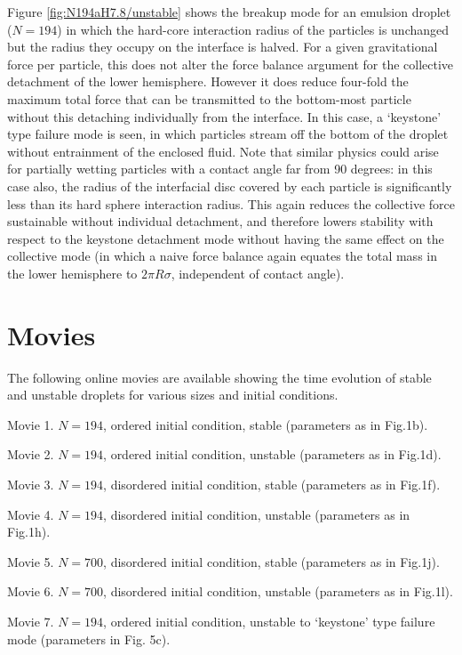 \documentclass[aps,prl,superscriptaddress,twocolumn,showpacs,floatfix]{revtex4-1}
\begin{document}
Figure \ref{fig:N194aH7.8/unstable} shows the breakup mode for an emulsion droplet ($N=194$) in which the hard-core interaction radius of the particles is unchanged but the radius they occupy on the interface is halved. For a given gravitational force per particle, this does not alter the force balance argument for the collective detachment of the lower hemisphere. However it does reduce four-fold the maximum total force that can be transmitted to the bottom-most particle without this detaching individually from the interface. In this case, a `keystone' type failure mode is seen, in which particles stream off the bottom of the droplet without entrainment of the enclosed fluid. Note that similar physics could arise for partially wetting particles with a contact angle far from 90 degrees: in this case also, the radius of the interfacial disc covered by each particle is significantly less than its hard sphere interaction radius. This again reduces the collective force sustainable without individual detachment, and therefore lowers stability with respect to the keystone detachment mode without having the same effect on the collective mode (in which a naive force balance again equates the total mass in the lower hemisphere to $2\pi R\sigma$, independent of contact angle).  


\section{Movies}

The following online movies are available showing the time evolution of stable and unstable droplets for various sizes and initial conditions.

Movie 1. $N = 194$, ordered initial condition, stable (parameters as in Fig.1b).

Movie 2. $N = 194$, ordered initial condition, unstable (parameters as in Fig.1d).

Movie 3. $N = 194$, disordered initial condition, stable (parameters as in Fig.1f).

Movie 4. $N = 194$, disordered initial condition, unstable (parameters as in Fig.1h).

Movie 5. $N = 700$, disordered initial condition, stable (parameters as in Fig.1j).

Movie 6. $N = 700$, disordered initial condition, unstable (parameters as in Fig.1l).

Movie 7. $N=194$, ordered initial condition, unstable to `keystone' type failure mode (parameters in Fig. 5c).  
\vfill\eject
\end{document}
